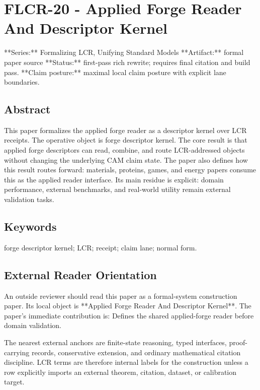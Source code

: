 \documentclass[11pt]{article}
\begin{document}
\section*{FLCR-20 - Applied Forge Reader And Descriptor Kernel}

**Series:** Formalizing LCR, Unifying Standard Models
**Artifact:** formal paper source
**Status:** first-pass rich rewrite; requires final citation and build pass.
**Claim posture:** maximal local claim posture with explicit lane boundaries.

\subsection*{Abstract}

This paper formalizes the applied forge reader as a descriptor kernel over LCR receipts. The operative object is forge descriptor kernel. The core result is that applied forge descriptors can read, combine, and route LCR-addressed objects without changing the underlying CAM claim state. The paper also defines how this result routes forward: materials, proteins, games, and energy papers consume this as the applied reader interface. Its main residue is explicit: domain performance, external benchmarks, and real-world utility remain external validation tasks.

\subsection*{Keywords}

forge descriptor kernel; LCR; receipt; claim lane; normal form.

\subsection*{External Reader Orientation}

An outside reviewer should read this paper as a formal-system construction paper. Its local object is **Applied Forge Reader And Descriptor Kernel**. The paper's immediate contribution is: Defines the shared applied-forge reader before domain validation.

The nearest external anchors are finite-state reasoning, typed interfaces, proof-carrying records, conservative extension, and ordinary mathematical citation discipline. LCR terms are therefore internal labels for the construction unless a row explicitly imports an external theorem, citation, dataset, or calibration target.
\end{document}
